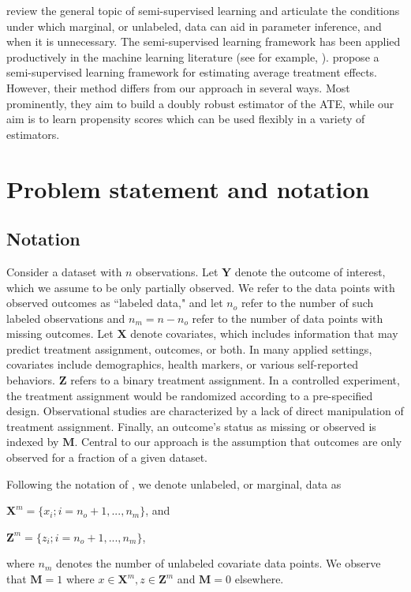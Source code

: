 \documentclass[aos]{imsart}
\newcommand{\X}{\mathbf{X}}
\newcommand{\M}{\mathbf{M}}
\newcommand{\Y}{\mathbf{Y}}
\newcommand{\Z}{\mathbf{Z}}
\begin{document}
\cite{liang2007use} review the general topic of semi-supervised learning and articulate the conditions 
under which marginal, or unlabeled, data can aid in parameter inference, and when it is unnecessary. 
The semi-supervised learning framework has been applied productively in the machine learning literature 
(see for example, \cite{kingma2014semi}).
\cite{cheng2018efficient} propose a semi-supervised learning framework for estimating average treatment effects. 
However, their method differs from our approach in several ways. 
Most prominently, they aim to build a doubly robust estimator of the ATE, while our aim is to 
learn propensity scores which can be used flexibly in a variety of estimators.

\section{Problem statement and notation}

\subsection{Notation}
\label{subsection:notation}

Consider a dataset with $n$ observations. Let $\Y$ denote the outcome of interest, which we assume to be only partially observed. 
We refer to the data points with observed outcomes as ``labeled data," and let $n_o$ refer to the number of such labeled observations 
and $n_m = n - n_o$ refer to the number of data points with missing outcomes.
Let $\X$ denote covariates, which includes information that may predict treatment assignment, outcomes, or both. 
In many applied settings, covariates include demographics, health markers, or various self-reported behaviors.
$\Z$ refers to a binary treatment assignment. In a controlled experiment, the treatment assignment would be randomized according to a pre-specified design. 
Observational studies are characterized by a lack of direct manipulation of treatment assignment. 
Finally, an outcome's status as missing or observed is indexed by $\M$. Central to our approach is the assumption that outcomes are only 
observed for a fraction of a given dataset.

Following the notation of \cite{liang2007use}, we denote unlabeled, or marginal, data as

$\X^m = \{x_i; i = n_o + 1, ... , n_m \}$, and 

$\Z^m = \{z_i; i = n_o + 1, ... ,n_m \}$, 

where $n_m$ denotes the number of unlabeled covariate data points. We observe that $\M = 1$ where $x \in \X^m, z \in \Z^m$ and $\M = 0$ elsewhere.
\end{document}
